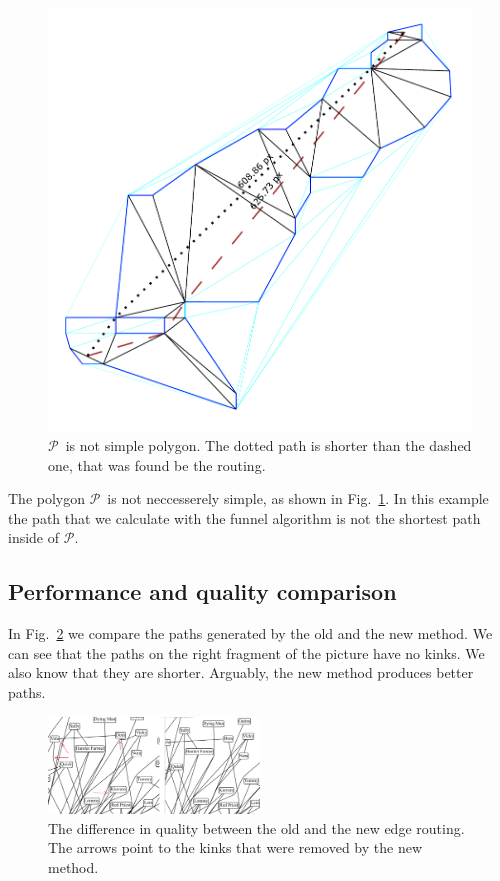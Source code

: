 \documentclass{gd-llncs}
\newcommand{\plg}{$\mathcal{P}$}
\begin{document}
{\begin{figure}[]
  \centering
  \includegraphics*[]{sleeve_diagonals_not_optimal.pdf}
  \caption{\plg~is not simple polygon. The dotted path is shorter than the dashed one, that was found be the routing.}
  \label{fig:non_optimal_path}
\end{figure}


The polygon \plg~is not neccesserely simple, as shown in Fig.~\ref{fig:non_optimal_path}.
In this example the path that we calculate with the funnel algorithm is not the shortest path inside of \plg.
\subsection*{Performance and quality comparison}
In Fig.~\ref{fig:improved_routing} we compare the paths generated by the old and the new method. We can see that the paths on the right fragment of the picture have no kinks. We also know that they are shorter. Arguably, the new method produces better paths.
\begin{figure}[]
  \centering
  \includegraphics*[width=0.5\textwidth]{comparison.png}
  \caption{The difference in quality between the old and the new edge routing. The arrows point to the kinks that were removed by the new method.}
  \label{fig:improved_routing}
\end{figure}

}
\end{document}
